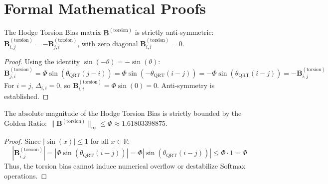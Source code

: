 \section{Formal Mathematical Proofs}

\begin{theorem}
The Hodge Torsion Bias matrix $\mathbf{B}^{(\text{torsion})}$ is strictly anti-symmetric: $\mathbf{B}_{i,j}^{(\text{torsion})} = -\mathbf{B}_{j,i}^{(\text{torsion})}$, with zero diagonal $\mathbf{B}_{i,i}^{(\text{torsion})} = 0$.
\end{theorem}

\begin{proof}
Using the identity $\sin(-\theta) = -\sin(\theta)$:
\begin{equation}
    \mathbf{B}_{j,i}^{(\text{torsion})} = \Phi \sin(\theta_{\text{QRT}}(j - i)) = \Phi \sin(-\theta_{\text{QRT}}(i - j)) = -\Phi \sin(\theta_{\text{QRT}}(i - j)) = -\mathbf{B}_{i,j}^{(\text{torsion})}
\end{equation}
For $i = j$, $\Delta_{i,i} = 0$, so $\mathbf{B}_{i,i}^{(\text{torsion})} = \Phi \sin(0) = 0$. Anti-symmetry is established.
\end{proof}

\begin{theorem}
The absolute magnitude of the Hodge Torsion Bias is strictly bounded by the Golden Ratio: $\|\mathbf{B}^{(\text{torsion})}\|_{\infty} \le \Phi \approx 1.61803398875$.
\end{theorem}

\begin{proof}
Since $|\sin(x)| \le 1$ for all $x \in \mathbb{R}$:
\begin{equation}
    |\mathbf{B}_{i,j}^{(\text{torsion})}| = |\Phi \sin(\theta_{\text{QRT}}(i - j))| = \Phi |\sin(\theta_{\text{QRT}}(i - j))| \le \Phi \cdot 1 = \Phi
\end{equation}
Thus, the torsion bias cannot induce numerical overflow or destabilize Softmax operations.
\end{proof}